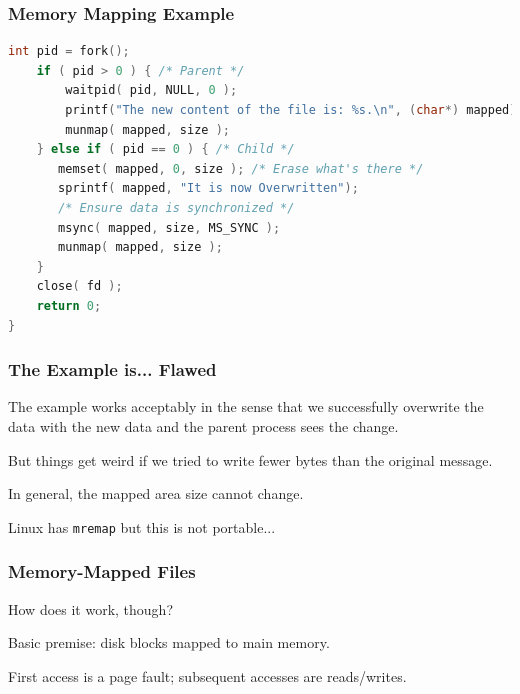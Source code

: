 \begin{frame}[fragile]
	\frametitle{Memory Mapping Example}

	\begin{lstlisting}[language=C]
    int pid = fork();
    if ( pid > 0 ) { /* Parent */
        waitpid( pid, NULL, 0 );
        printf("The new content of the file is: %s.\n", (char*) mapped);
        munmap( mapped, size );
    } else if ( pid == 0 ) { /* Child */
       memset( mapped, 0, size ); /* Erase what's there */
       sprintf( mapped, "It is now Overwritten");
       /* Ensure data is synchronized */
       msync( mapped, size, MS_SYNC );
       munmap( mapped, size );
    }
    close( fd );
    return 0;
}
\end{lstlisting}

\end{frame}

\begin{frame}
	\frametitle{The Example is... Flawed}

	The example works acceptably in the sense that we successfully overwrite the data with the new data and the parent process sees the change.

	But things get weird if we tried to write fewer bytes than the original message.

	In general, the mapped area size cannot change.

	Linux has \texttt{mremap} but this is not portable...

\end{frame}

\begin{frame}
\frametitle{Memory-Mapped Files}

How does it work, though?

Basic premise: disk blocks mapped to main memory.

First access is a page fault; subsequent accesses are reads/writes.

\end{frame}






